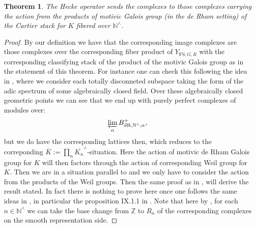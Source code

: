 \documentclass[12pt]{article}
\newtheorem{theorem}{Theorem}
\theoremstyle{definition}
\begin{document}
\begin{theorem}
The Hecke operator sends the complexes to those complexes carrying the action from the products of motivic Galois group (in the de Rham setting) of the Cartier stack for $K$ fibered over $\mathbb{N}^\wedge$.
\end{theorem}

\begin{proof}
By our definition we have that the corresponding image complexes are those complexes over the corresponding fiber product of $Y_{\mathrm{FS},G,R}$ with the corresponding classifying stack of the product of the motivic Galois group as in the statement of this theorem. For instance one can check this following the idea in \cite{1S5}, \cite{1S6} where we consider each totally disconneted subspace taking the form of the adic spectrum of some algebraically closed field. Over these algebraically closed geometric points we can see that we end up with purely perfect complexes of modules over:
\begin{align}
\varprojlim_\alpha B^+_\mathrm{dR,\mathbb{N}^\wedge,\alpha},
\end{align}
but we do have the corresponding lattices then, which reduces to the correponding $\overline{K}:=\prod_n \overline{K_n}^\wedge$-situation. Here the action of motivic de Rham Galois group for $K$ will then factors through the action of corresponding Weil group for $K$. Then we are in a situation parallel to \cite{2LH} and we only have to consider the action from the products of the Weil groups. Then the same proof as in \cite{1FS}, \cite{2LH} will derive the result stated. In fact there is nothing to prove here once one follows the same ideas in \cite{2LH}, in particular the proposition IX.1.1 in \cite{1FS}. Note that here by \cite{1S5}, \cite{1S6} for each $n\in \mathbb{N}^\wedge$ we can take the base change from $\mathbb{Z}$ to $R_n$ of the corresponding complexes on the smooth representation side.
\end{proof}
\end{document}
